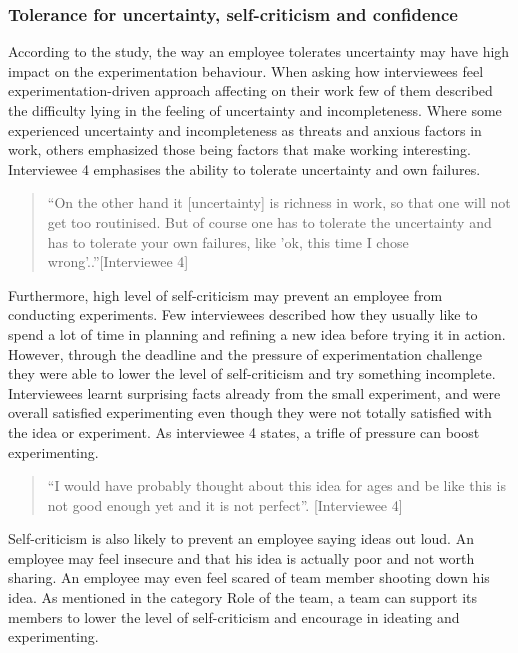 \subsubsection{Tolerance for uncertainty, self-criticism and confidence}
According to the study, the way an employee tolerates uncertainty may have high impact on the experimentation behaviour. When asking how interviewees feel experimentation-driven approach affecting on their work few of them described the difficulty lying in the feeling of uncertainty and incompleteness. Where some experienced uncertainty and incompleteness as threats and anxious factors in work, others emphasized those being factors that make working interesting. Interviewee 4 emphasises the ability to tolerate uncertainty and own failures.
\begin{quote}
``On the other hand it [uncertainty] is richness in work, so that one will not get too routinised. But of course one has to tolerate the uncertainty and has to tolerate your own failures, like 'ok, this time I chose wrong'..''[Interviewee 4]
\end{quote}
Furthermore, high level of self-criticism may prevent an employee from conducting experiments. Few interviewees described how they usually like to spend a lot of time in planning and refining a new idea before trying it in action. However, through the deadline and the pressure of experimentation challenge they were able to lower the level of self-criticism and try something incomplete. Interviewees learnt surprising facts already from the small experiment, and were overall satisfied experimenting even though they were not totally satisfied with the idea or experiment. As interviewee 4 states, a trifle of pressure can boost experimenting.
\begin{quote}
``I would have probably thought about this idea for ages and be like this is not good enough yet and it is not perfect''. [Interviewee 4]
\end{quote}
Self-criticism is also likely to prevent an employee saying ideas out loud. An employee may feel insecure and that his idea is actually poor and not worth sharing. An employee may even feel scared of team member shooting down his idea. As mentioned in the category Role of the team, a team can support its members to lower the level of self-criticism and encourage in ideating and experimenting. 

